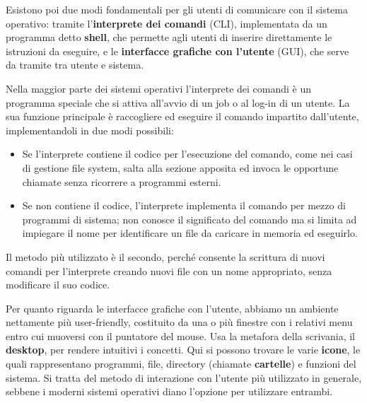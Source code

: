 \noindent Esistono poi due modi fondamentali per gli utenti di comunicare con il sistema operativo: tramite l'\textbf{interprete dei comandi} (CLI), implementata da un programma detto \textbf{shell}, che permette agli utenti di inserire direttamente le istruzioni da eseguire, e le \textbf{interfacce grafiche con l'utente} (GUI), che serve da tramite tra utente e sistema.\par
Nella maggior parte dei sistemi operativi l'interprete dei comandi è un programma speciale che si attiva all'avvio di un job o al log-in di un utente. La sua funzione principale è raccogliere ed eseguire il comando impartito dall'utente, implementandoli in due modi possibili: \begin{itemize}
	\item Se l'interprete contiene il codice per l'esecuzione del comando, come nei casi di gestione file system, salta alla sezione apposita ed invoca le opportune chiamate senza ricorrere a programmi esterni.
	\item Se non contiene il codice, l'interprete implementa il comando per mezzo di programmi di sistema; non conosce il significato del comando ma si limita ad impiegare il nome per identificare un file da caricare in memoria ed eseguirlo.
\end{itemize}
\noindent Il metodo più utilizzato è il secondo, perché consente la scrittura di nuovi comandi per l'interprete creando nuovi file con un nome appropriato, senza modificare il suo codice.\par
Per quanto riguarda le interfacce grafiche con l'utente, abbiamo un ambiente nettamente più user-friendly, costituito da una o più finestre con i relativi menu entro cui muoversi con il puntatore del mouse. Usa la metafora della scrivania, il \textbf{desktop}, per rendere intuitivi i concetti. Qui si possono trovare le varie \textbf{icone}, le quali rappresentano programmi, file, directory (chiamate \textbf{cartelle}) e funzioni del sistema. Si tratta del metodo di interazione con l'utente più utilizzato in generale, sebbene i moderni sistemi operativi diano l'opzione per utilizzare entrambi.

%

